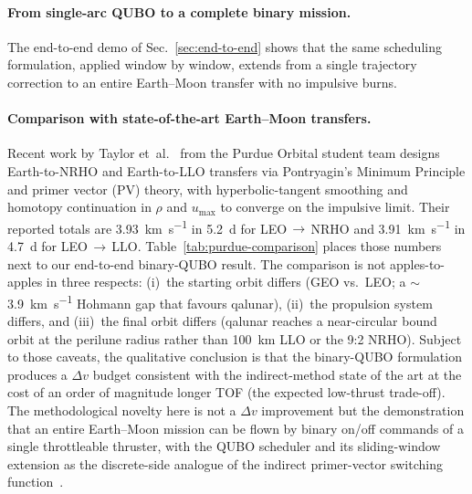 \documentclass[11pt,a4paper]{article}
\theoremstyle{plain}
\begin{document}
\paragraph{From single-arc QUBO to a complete binary mission.}
The end-to-end demo of Sec.~\ref{sec:end-to-end} shows that
the same scheduling formulation, applied window by window,
extends from a single trajectory correction to an entire
Earth--Moon transfer with no impulsive burns.

\paragraph{Comparison with state-of-the-art Earth--Moon
transfers.} Recent work by Taylor et~al.~\cite{Taylor2026} from
the Purdue Orbital student team designs Earth-to-NRHO and
Earth-to-LLO transfers via Pontryagin's Minimum Principle and
primer vector (PV) theory, with hyperbolic-tangent smoothing and
homotopy continuation in $\rho$ and $u_\mathrm{max}$ to converge
on the impulsive limit. Their reported totals are
\SI{3.93}{\km\per\second} in \SI{5.2}{\day} for LEO\,$\to$\,NRHO
and \SI{3.91}{\km\per\second} in \SI{4.7}{\day} for
LEO\,$\to$\,LLO. Table~\ref{tab:purdue-comparison} places those
numbers next to our end-to-end binary-QUBO result. The comparison
is not apples-to-apples in three respects: (i)~the starting orbit
differs (GEO vs.\ LEO; a $\sim$\SI{3.9}{\km\per\second} Hohmann
gap that favours qalunar), (ii)~the propulsion system differs, and (iii)~the final
orbit differs (qalunar reaches a near-circular bound orbit at the
perilune radius rather than \SI{100}{\km} LLO or the 9{:}2 NRHO).
Subject to those caveats, the qualitative conclusion is that the
binary-QUBO formulation produces a $\Delta v$ budget consistent
with the indirect-method state of the art at the cost of an order
of magnitude longer TOF (the expected low-thrust trade-off). The
methodological novelty here is not a $\Delta v$ improvement but
the demonstration that an entire Earth--Moon mission can be flown
by binary on/off commands of a single throttleable thruster, with
the QUBO scheduler and its sliding-window extension as the
discrete-side analogue of the indirect primer-vector switching
function~\cite{Taylor2026}.
\end{document}

